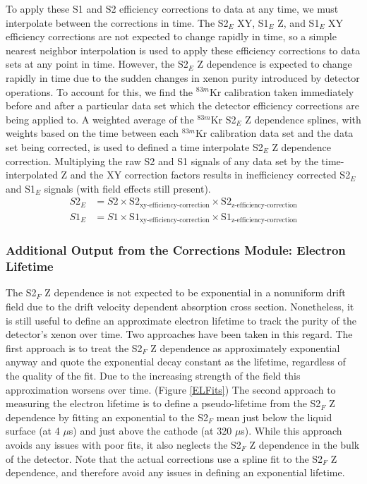 To apply these S1 and S2 efficiency corrections to data at any time, we must interpolate between the corrections in time.  The S2$_E$ XY, S1$_E$ Z, and S1$_E$ XY efficiency corrections are not expected to change rapidly in time, so a simple nearest neighbor interpolation is used to apply these efficiency corrections to data sets at any point in time.  However, the S2$_E$ Z dependence is expected to change rapidly in time due to the sudden changes in xenon purity introduced by detector operations.  To account for this, we find the $^{83m}$Kr calibration taken immediately before and after a particular data set which the detector efficiency corrections are being applied to.  A weighted average of the $^{83m}$Kr S2$_E$ Z dependence splines, with weights based on the time between each $^{83m}$Kr calibration data set and the data set being corrected, is used to defined a time interpolate S2$_E$ Z dependence correction.  Multiplying the raw S2 and S1 signals of any data set by the time-interpolated Z and the XY correction factors results in inefficiency corrected S2$_E$ and S1$_E$ signals (with field effects still present).
\begin{align}
S2_E &=S2 \times \mbox{S}2_{\mbox{xy-efficiency-correction}} \times \mbox{S}2_{\mbox{z-efficiency-correction}} \\
S1_E &=S1 \times \mbox{S}1_{\mbox{xy-efficiency-correction}} \times \mbox{S}1_{\mbox{z-efficiency-correction}}
\end{align}

\subsubsection{Additional Output from the Corrections Module: Electron Lifetime}

The S2$_F$ Z dependence is not expected to be exponential in a nonuniform drift field due to the drift velocity dependent absorption cross section.  Nonetheless, it is still useful to define an approximate electron lifetime to track the purity of the detector's xenon over time.  Two approaches have been taken in this regard.  The first approach is to treat the S2$_F$ Z dependence as approximately exponential anyway and quote the exponential decay constant as the lifetime, regardless of the quality of the fit.  Due to the increasing strength of the field this approximation worsens over time. (Figure \ref{ELFits})  The second approach to measuring the electron lifetime is to define a pseudo-lifetime from the S2$_F$ Z dependence by fitting an exponential to the S2$_F$ mean just below the liquid surface (at 4 $\mu$s) and just above the cathode (at 320 $\mu$s).  While this approach avoids any issues with poor fits, it also neglects the S2$_F$ Z dependence in the bulk of the detector.  Note that the actual corrections use a spline fit to the S2$_F$ Z dependence, and therefore avoid any issues in defining an exponential lifetime.



